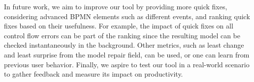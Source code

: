 \documentclass[
onecolumn, %
]{ceurart}
\begin{document}
In future work, we aim to improve our tool by providing more quick fixes, considering advanced BPMN elements such as different events, and ranking quick fixes based on their usefulness.
For example, the impact of quick fixes on all control flow errors can be part of the ranking since the resulting model can be checked instantaneously in the background.
Other metrics, such as least change and least surprise from the model repair field, can be used, or one can learn from previous user behavior.
Finally, we aspire to test our tool in a real-world scenario to gather feedback and measure its impact on productivity.



\end{document}
